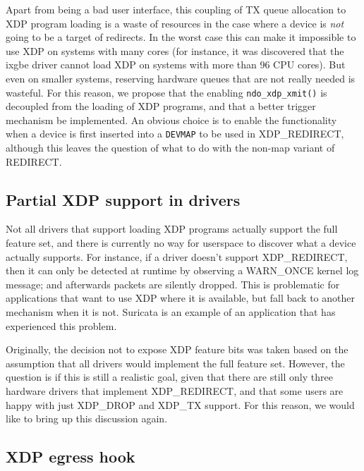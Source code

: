 \documentclass[sigconf]{acmart}
\begin{document}
Apart from being a bad user interface, this coupling of TX queue allocation to
XDP program loading is a waste of resources in the case where a device is
\emph{not} going to be a target of redirects. In the worst case this can make it
impossible to use XDP on systems with many cores (for instance, it was
discovered that the ixgbe driver cannot load XDP on systems with more than 96
CPU cores). But even on smaller systems, reserving hardware queues that are not
really needed is wasteful. For this reason, we propose that the enabling
\texttt{ndo\_xdp\_xmit()} is decoupled from the loading of XDP programs, and
that a better trigger mechanism be implemented. An obvious choice is to enable
the functionality when a device is first inserted into a \texttt{DEVMAP} to be
used in XDP\_REDIRECT, although this leaves the question of what to do with the
non-map variant of REDIRECT.

\subsection{Partial XDP support in drivers}
\label{sec:partial-xdp-support}

Not all drivers that support loading XDP programs actually support the full
feature set, and there is currently no way for userspace to discover what a
device actually supports. For instance, if a driver doesn't support
XDP\_REDIRECT, then it can only be detected at runtime by observing a WARN\_ONCE
kernel log message; and afterwards packets are silently dropped. This is
problematic for applications that want to use XDP where it is available, but
fall back to another mechanism when it is not. Suricata is an example of an
application that has experienced this problem.

Originally, the decision not to expose XDP feature bits was taken based on the
assumption that all drivers would implement the full feature set. However, the
question is if this is still a realistic goal, given that there are still only
three hardware drivers that implement XDP\_REDIRECT, and that some users are
happy with just XDP\_DROP and XDP\_TX support. For this reason, we would like to
bring up this discussion again.


\subsection{XDP egress hook}
\label{sec:xdp-egress-hook}
\end{document}
